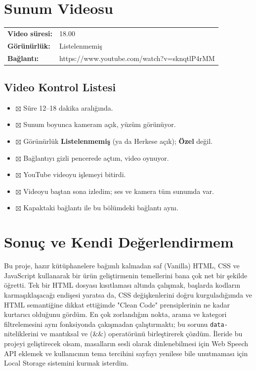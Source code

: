 \documentclass[12pt,a4paper]{article}
\begin{document}
\section{Sunum Videosu}
\begin{center}
\begin{tabular}{@{}ll@{}}
\textbf{Video süresi:} & 18.00  \\
\textbf{Görünürlük:} & Listelenmemiş \\
\textbf{Bağlantı:} & https://www.youtube.com/watch?v=sknqtlP4rMM \\
\end{tabular}
\end{center}

\subsection{Video Kontrol Listesi}
\begin{itemize}[label={}]
  \item $\boxtimes$ Süre 12--18 dakika aralığında.
  \item $\boxtimes$ Sunum boyunca kameram açık, yüzüm görünüyor.
  \item $\boxtimes$ Görünürlük \textbf{Listelenmemiş} (ya da Herkese açık); \textbf{Özel} değil.
  \item $\boxtimes$ Bağlantıyı gizli pencerede açtım, video oynuyor.
  \item $\boxtimes$ YouTube videoyu işlemeyi bitirdi.
  \item $\boxtimes$ Videoyu baştan sona izledim; ses ve kamera tüm sunumda var.
  \item $\boxtimes$ Kapaktaki bağlantı ile bu bölümdeki bağlantı aynı.
\end{itemize}

\section{Sonuç ve Kendi Değerlendirmem}
Bu proje, hazır kütüphanelere bağımlı kalmadan saf (Vanilla) HTML, CSS ve JavaScript kullanarak bir ürün geliştirmenin temellerini bana çok net bir şekilde öğretti. Tek bir HTML dosyası kısıtlaması altında çalışmak, başlarda kodların karmaşıklaşacağı endişesi yaratsa da, CSS değişkenlerini doğru kurguladığımda ve HTML semantiğine dikkat ettiğimde "Clean Code" prensiplerinin ne kadar kurtarıcı olduğunu gördüm. En çok zorlandığım nokta, arama ve kategori filtrelemesini aynı fonksiyonda çakışmadan çalıştırmaktı; bu sorunu \texttt{data-} niteliklerini ve mantıksal ve (\&\&) operatörünü birleştirerek çözdüm. İleride bu projeyi geliştirecek olsam, masalların sesli olarak dinlenebilmesi için Web Speech API eklemek ve kullanıcının tema tercihini sayfayı yenilese bile unutmaması için Local Storage sistemini kurmak isterdim.
\end{document}
